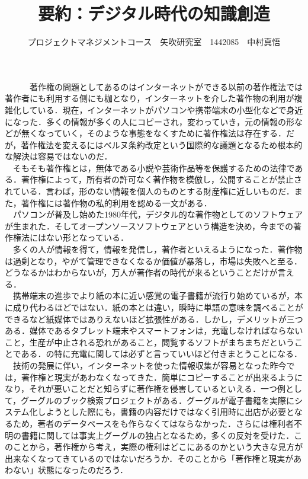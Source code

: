 \documentclass[uplatex,twocolumn,dvipdfmx]{jsarticle}
\title{\vspace{-5mm}\fontsize{14pt}{0pt}\selectfont 要約：デジタル時代の知識創造}
\author{\normalsize プロジェクトマネジメントコース　矢吹研究室　1442085　中村真悟}
\date{}
\begin{document}
\fontsize{10.5pt}{\baselineskip}\selectfont
\maketitle





　　　著作権の問題としてあるのはインターネットができる以前の著作権法では著作者にも利用する側にも枷となり，インターネットを介した著作物の利用が複雑化している．現在，インターネットがパソコンや携帯端末の小型化などで身近になった．多くの情報が多くの人にコピーされ，変わっていき，元の情報の形などが無くなっていく，そのような事態をなくすために著作権法は存在する．だが，著作権法を変えるにはベルヌ条約改定という国際的な議題となるため根本的な解決は容易ではないのだ．
\\　そもそも著作権とは，無体である小説や芸術作品等を保護するための法律である．著作権によって，所有者の許可なく著作物を模倣し，公開することが禁止されている．言わば，形のない情報を個人のものとする財産権に近しいものだ．また，著作権には著作物の私的利用を認める一文がある．
\\　パソコンが普及し始めた1980年代，デジタル的な著作物としてのソフトウェアが生まれた．そしてオープンソースソフトウェアという構造を決め，今までの著作権法にはない形となっている．
\\　多くの人が情報を得て，情報を発信し，著作者といえるようになった．著作物は過剰となり，やがて管理できなくなるか価値が暴落し，市場は失敗へと至る．どうなるかはわからないが，万人が著作者の時代が来るということだけが言える．
\\　携帯端末の進歩でより紙の本に近い感覚の電子書籍が流行り始めているが，本に成り代わるほどではない．紙の本とは違い，瞬時に単語の意味を調べることができるなど紙媒体ではありえないほど拡張性がある．しかし，デメリットが三つある．媒体であるタブレット端末やスマートフォンは，充電しなければならないこと，生産が中止される恐れがあること，閲覧するソフトがまちまちだということである．の特に充電に関しては必ずと言っていいほど付きまとうことになる．
\\　技術の発展に伴い，インターネットを使った情報収集が容易となった昨今では，著作権と現実があわなくなってきた．簡単にコピーすることが出来るようになり，それが悪いことだと知らずに著作権を侵害しているといえる．一つ例として，グーグルのブック検索プロジェクトがある．グーグルが電子書籍を実際にシステム化しようとした際にも，書籍の内容だけではなく引用時に出店が必要となるため，著者のデータベースをも作らなくてはならなかった．さらには権利者不明の書籍に関しては事実上グーグルの独占となるため，多くの反対を受けた．このことから，著作権から考え，実際の権利はどこにあるのかという大きな見方が出来なくなってきているのではないだろうか．そのことから「著作権と現実があわない」状態になったのだろう．
\end{document}
